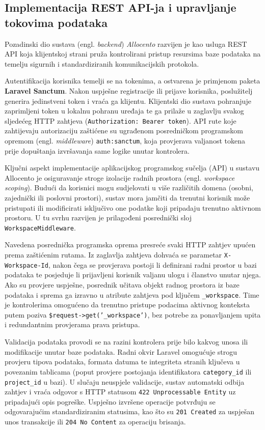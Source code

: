 \documentclass[a4paper,12pt,oneside]{article}
\begin{document}
	\subsection{Implementacija REST API-ja i upravljanje tokovima podataka}
	
	Pozadinski dio sustava (engl. \textit{backend}) \textit{Allocento} razvijen je kao usluga REST API koja klijentskoj strani pruža kontrolirani pristup resursima baze podataka na temelju sigurnih i standardiziranih komunikacijskih protokola. 
	
	Autentifikacija korisnika temelji se na tokenima, a ostvarena je primjenom paketa \textbf{Laravel Sanctum}. Nakon uspješne registracije ili prijave korisnika, poslužitelj generira jedinstveni token i vraća ga klijentu. Klijentski dio sustava pohranjuje zaprimljeni token u lokalnu pohranu uređaja te ga prilaže u zaglavlju svakog sljedećeg HTTP zahtjeva (\texttt{Authorization: Bearer token}). API rute koje zahtijevaju autorizaciju zaštićene su ugrađenom posredničkom programskom opremom (engl. \textit{middleware}) \texttt{auth:sanctum}, koja provjerava valjanost tokena prije dopuštanja izvršavanja same logike unutar kontrolera.
	
	Ključni aspekt implementacije aplikacijskog programskog sučelja (API) u sustavu Allocento je osiguravanje stroge izolacije radnih prostora (engl. \textit{workspace scoping}). Budući da korisnici mogu sudjelovati u više različitih domena (osobni, zajednički ili poslovni prostori), sustav mora jamčiti da trenutni korisnik može pristupati ili modificirati isključivo one podatke koji pripadaju trenutno aktivnom prostoru. U tu svrhu razvijen je prilagođeni posrednički sloj \texttt{WorkspaceMiddleware}.
	
	Navedena posrednička programska oprema presreće svaki HTTP zahtjev upućen prema zaštićenim rutama. Iz zaglavlja zahtjeva dohvaća se parametar \texttt{X-Workspace-Id}, nakon čega se provjerava postoji li definirani radni prostor u bazi podataka te posjeduje li prijavljeni korisnik valjanu ulogu i članstvo unutar njega. Ako su provjere uspješne, posrednik učitava objekt radnog prostora iz baze podataka i sprema ga izravno u atribute zahtjeva pod ključem \texttt{\_workspace}. Time je kontrolerima omogućeno da trenutno pristupe podacima aktivnog konteksta putem poziva \texttt{\$request->get('\_workspace')}, bez potrebe za ponavljanjem upita i redundantnim provjerama prava pristupa.
	
	Validacija podataka provodi se na razini kontrolera prije bilo kakvog unosa ili modifikacije unutar baze podataka. Radni okvir Laravel omogućuje strogu provjeru tipova podataka, formata datuma te integriteta stranih ključeva u povezanim tablicama (poput provjere postojanja identifikatora \texttt{category\_id} ili \texttt{project\_id} u bazi). U slučaju neuspjele validacije, sustav automatski odbija zahtjev i vraća odgovor s HTTP statusom \texttt{422 Unprocessable Entity} uz pripadajući opis pogreške. Uspješno izvršene operacije potvrđuju se odgovarajućim standardiziranim statusima, kao što su \texttt{201 Created} za uspješan unos transakcije ili \texttt{204 No Content} za operaciju brisanja.
\end{document}
